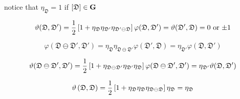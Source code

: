 notice that $\eta_{\mathfrak{D}}=1$ if $[\mathfrak{D}]\in \mathbf{G}$

\[
    \vartheta(\mathfrak{D},\mathfrak{D}') 
    = 
    \frac{1}{2}
    \left[ 
    1
    +
    \eta_{\mathfrak{D}}
    \eta_{\mathfrak{D}'}
    \eta_{\mathfrak{D}'\ominus\mathfrak{D}}
     \right]\varphi(\mathfrak{D},\mathfrak{D}')
    =
    \vartheta(\mathfrak{D}',\mathfrak{D})
    =
    \text{$0$ or $\pm 1$}
\]

\[
\varphi(\mathfrak{D}\ominus\mathfrak{D}',\mathfrak{D}') = \eta_{\mathfrak{D}}\eta_{\mathfrak{D}\ominus\mathfrak{D}'} \varphi(\mathfrak{D}',\mathfrak{D})
=
\eta_{\mathfrak{D}'} \varphi(\mathfrak{D},\mathfrak{D}')
\]

\[
\vartheta(\mathfrak{D}\ominus\mathfrak{D}',\mathfrak{D}')
=
\frac{1}{2}
\left[ 
    1
    +
    \eta_{\mathfrak{D}\ominus\mathfrak{D}'}
    \eta_{\mathfrak{D}'}
    \eta_{\mathfrak{D}}
 \right]
\varphi(\mathfrak{D}\ominus\mathfrak{D}',\mathfrak{D}') 
= 
\eta_{\mathfrak{D}'}
\vartheta(\mathfrak{D},\mathfrak{D}')
\]


\[
\vartheta\left( \mathfrak{D},\mathfrak{D} \right) = 
\frac{1}{2}\left[ 1 + \eta_\mathfrak{D}\eta_{\mathfrak{D}} \eta_{\mathfrak{D}\ominus\mathfrak{D}} \right] \eta_\mathfrak{D}
=
\eta_\mathfrak{D}
\]

